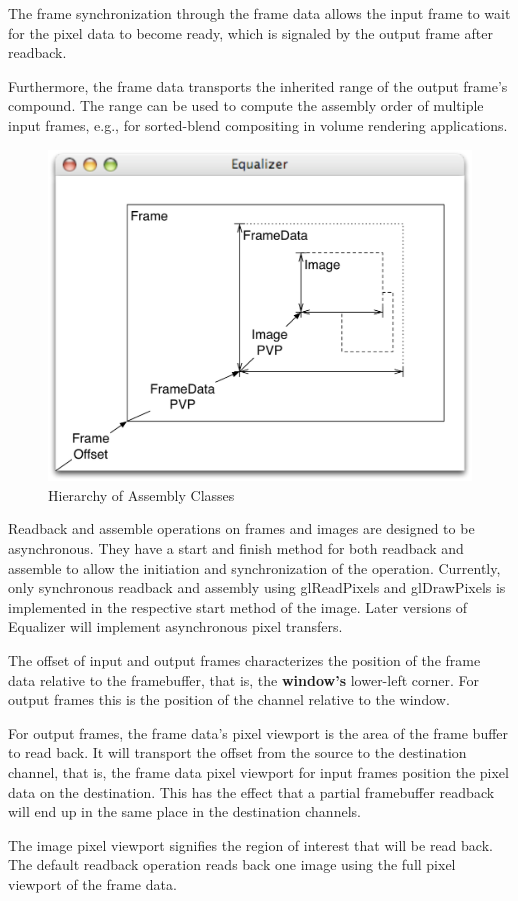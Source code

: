 \documentclass[10pt,a4]{scrartcl}
\begin{document}
The frame synchronization through the frame data allows the input frame
to wait for the pixel data to become ready, which is signaled by the
output frame after readback.

Furthermore, the frame data transports the inherited range of the output
frame's compound. The range can be used to compute the assembly order of
multiple input frames, e.g., for sorted-blend compositing in volume
rendering applications.

\begin{figure}
  \includegraphics[width=.618\textwidth]{images/assembly.pdf}
  {\caption{\label{fAssembly}Hierarchy of Assembly Classes}}
\end{figure}
Readback and assemble operations on frames and images are designed to be
asynchronous. They have a start and finish method for both readback and
assemble to allow the initiation and synchronization of the operation.
Currently, only synchronous readback and assembly using
\textsf{glReadPixels} and \textsf{glDrawPixels} is implemented in the
respective start method of the image. Later versions of Equalizer will
implement asynchronous pixel transfers.

The offset of input and output frames characterizes the position of the
frame data relative to the framebuffer, that is, the \textbf{window's}
lower-left corner. For output frames this is the position of the channel
relative to the window.

For output frames, the frame data's pixel viewport is the area of the
frame buffer to read back. It will transport the offset from the source
to the destination channel, that is, the frame data pixel viewport for
input frames position the pixel data on the destination. This has the
effect that a partial framebuffer readback will end up in the same place
in the destination channels.

The image pixel viewport signifies the region of interest that will be read
back. The default readback operation reads back one image using the full
pixel viewport of the frame data.
\end{document}
